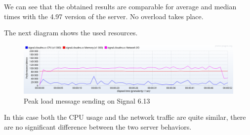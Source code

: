 We can see that the obtained results are comparable for average and median times with the 4.97 version of the server.
No overload takes place.

The next diagram shows the used resources.

\begin{figure}[H]
    \centering
    \includegraphics[width=\textwidth]{images/613/6.13-peak-message}
    \caption{Peak load message sending on Signal 6.13}
    \label{fig:signalhighmessageloadnew}
\end{figure}

In this case both the CPU usage and the network traffic are quite similar, there are no significant difference between the two server behaviors.